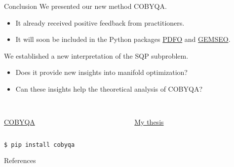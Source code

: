 \documentclass[
]{talk}
\begin{document}
\begin{frame}[fragile]{Conclusion}
    We presented our new method COBYQA.
    \begin{itemize}
        \item It already received \alert{positive} feedback from practitioners.
        \item It will soon be included in the Python packages \href{https://www.pdfo.net}{PDFO} and \href{https://gemseo.readthedocs.io}{GEMSEO}.
    \end{itemize}

    We established a new interpretation of the SQP subproblem.
    \begin{itemize}
        \item Does it provide new insights into \alert{manifold optimization}?
        \item Can these insights help the theoretical analysis of COBYQA?
    \end{itemize}

    \begin{columns}
        \begin{column}{0.5\textwidth}
            \begin{center}
                \\[1ex]
                \href{https://www.cobyqa.com}{COBYQA}
            \end{center}
        \end{column}
        \begin{column}{0.5\textwidth}
            \begin{center}
                \\[1ex]
                \href{http://tomragonneau.com/documents/thesis.pdf}{My thesis}
            \end{center}
        \end{column}
    \end{columns}

    \medskip

    \begin{block}{}
        \texttt{\$ pip install cobyqa}
    \end{block}
\end{frame}


\appendix
\begin{frame}[t,allowframebreaks]{References}
    \printbibliography[heading=none]
\end{frame}
\end{document}

